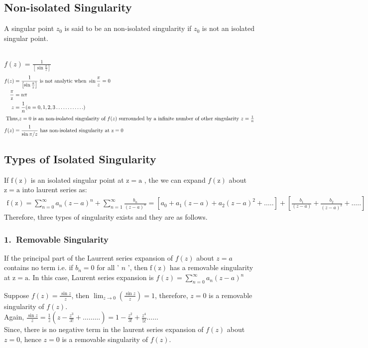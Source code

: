 \subsection{Non-isolated Singularity}
A singular point $z_{0}$ is said to be an non-isolated singularity if $z_{0}$ is not an isolated singular point.
\begin{example}$\left. \right. $\\\\
	$f(z)=\frac{1}{\left[\sin \frac{\pi}{z}\right]}$
	\begin{align*}
	f(z)&=\frac{1}{\left[\sin \frac{\pi}{z}\right]} \text { is not analytic when } \sin \frac{\pi}{z}=0 \\\frac{\pi}{\mathrm{z}}&=\mathrm{n} \pi \\ z&=\frac{1}{n}(n=0,1,2,3 \ldots \ldots \ldots \ldots)\\
	\intertext { Thus,$z=0$  is an non-isolated singularity of $ f(z)$ surrounded by a infinite number of other singularity $z=\frac{1}{n}$}
	f(z)&=\frac{1}{\sin \pi / z} \text { has non-isolated singularity at } \mathrm{z}=0
	\end{align*}
\end{example}

\subsection{Types of Isolated Singularity}
 If  $\mathrm{f}(\mathrm{z})$  is an isolated singular point at  $\mathrm{z}=\mathrm{a}$ , the we can expand $ f(\mathrm{z})$ about $ \mathrm{z}=\mathrm{a}$ into laurent series as: 
\begin{align*}
\mathrm{f}(\mathrm{z})=\sum_{n=0}^{\infty} a_{n}(z-a)^{n}+\sum_{n=1}^{\infty} \frac{b_{n}}{(z-a)^{n}}=\left[a_{0}+a_{1}(z-a)+a_{2}(z-a)^{2}+\ldots . .\right]+\left[\frac{b_{1}}{(z-a)}+\frac{b_{2}}{(z-a)^{2}}+\ldots . .\right]
\end{align*}
Therefore, three types of singularity exists and they are as follows.
\subsubsection{1.\ Removable Singularity } If the principal part of the Laurrent series expansion of $f(z)$ about $z=a$ contains no term i.e. if $b_{n}=0$ for all ' $n$ ', then $\mathrm{f}(\mathrm{z})$ has a removable singularity at $\mathrm{z}=\mathrm{a}$. In this case, Laurent series expansion is $f(z)=\sum_{n=0}^{\infty} a_{n}(z-a)^{n}$
\begin{example}$\left. \right. $\\
	Suppose $f(z)=\frac{\sin z}{z}$, then $\lim _{z \rightarrow 0}\left(\frac{\sin z}{z}\right)=1$, therefore, $z=0$ is a removable singularity of $f(z)$.\\
	Again, $\frac{\sin z}{z}=\frac{1}{z}\left(z-\frac{z^{3}}{3 !}+\ldots \ldots \ldots\right)=1-\frac{z^{2}}{3 !}+\frac{z^{4}}{5 !} \ldots \ldots$\\
	Since, there is no negative term in the laurent series expansion of $f(z)$ about $z=0$, hence $z=0$ is a removable singularity of $f(z)$.
\end{example}
